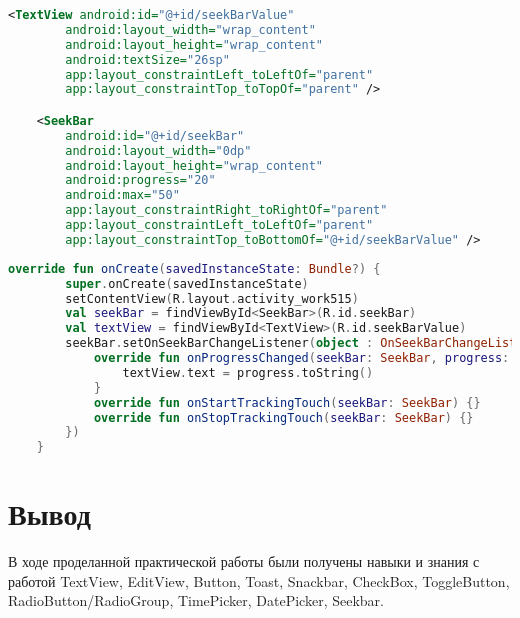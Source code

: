 \begin{lstlisting}[language=xml, caption=\leftline{timepicker XML}, label=lst:seekbar]
<TextView android:id="@+id/seekBarValue"
        android:layout_width="wrap_content"
        android:layout_height="wrap_content"
        android:textSize="26sp"
        app:layout_constraintLeft_toLeftOf="parent"
        app:layout_constraintTop_toTopOf="parent" />

    <SeekBar
        android:id="@+id/seekBar"
        android:layout_width="0dp"
        android:layout_height="wrap_content"
        android:progress="20"
        android:max="50"
        app:layout_constraintRight_toRightOf="parent"
        app:layout_constraintLeft_toLeftOf="parent"
        app:layout_constraintTop_toBottomOf="@+id/seekBarValue" />
\end{lstlisting}

\begin{lstlisting}[language=Kotlin, caption=\leftline{seekbar Kotlin}, label=lst:seekbarKotlin]
override fun onCreate(savedInstanceState: Bundle?) {
        super.onCreate(savedInstanceState)
        setContentView(R.layout.activity_work515)
        val seekBar = findViewById<SeekBar>(R.id.seekBar)
        val textView = findViewById<TextView>(R.id.seekBarValue)
        seekBar.setOnSeekBarChangeListener(object : OnSeekBarChangeListener {
            override fun onProgressChanged(seekBar: SeekBar, progress: Int, fromUser: Boolean) {
                textView.text = progress.toString()
            }
            override fun onStartTrackingTouch(seekBar: SeekBar) {}
            override fun onStopTrackingTouch(seekBar: SeekBar) {}
        })
    }
\end{lstlisting}

\clearpage

\section*{\LARGE{Вывод}}
В ходе проделанной практической работы были получены навыки и 
знания с работой TextView, EditView, Button, Toast, Snackbar, CheckBox, 
ToggleButton, RadioButton/RadioGroup, TimePicker, DatePicker, Seekbar.

